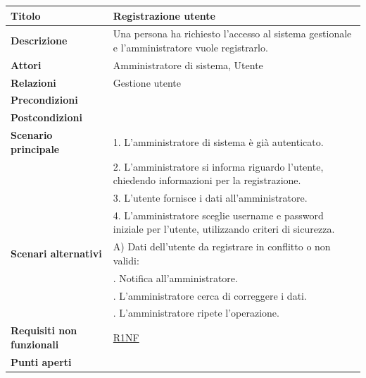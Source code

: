\documentclass[a4paper]{article}
\begin{document}


\begin{center}
\begin{tabularx}{1\textwidth}{|l|X|}
    \hline
	\textbf{Titolo} & Registrazione utente \\
	\hline
	\textbf{Descrizione} & Una persona ha richiesto l'accesso al sistema gestionale e l'amministratore vuole registrarlo. \\
	\hline
	\textbf{Attori} & Amministratore di sistema, Utente \\
	\hline
	\textbf{Relazioni} & Gestione utente \\
	\hline
	\textbf{Precondizioni} &  \\
	\hline
	\textbf{Postcondizioni} &  \\
	\hline
	\textbf{Scenario principale} & 1. L'amministratore di sistema è già autenticato.\\
	                             & 2. L'amministratore si informa riguardo l'utente, chiedendo informazioni per la registrazione.\\
								 & 3. L'utente fornisce i dati all'amministratore.\\
								 & 4. L'amministratore sceglie username e password iniziale per l'utente, utilizzando criteri di sicurezza.\\
	\hline
	\textbf{Scenari alternativi} & A) Dati dell'utente da registrare in conflitto o non validi: \\
								 & \quad 1. Notifica all'amministratore.\\
								 & \quad 2. L'amministratore cerca di correggere i dati.\\
								 & \quad 3. L'amministratore ripete l'operazione.\\
	\hline
	\textbf{Requisiti non funzionali} & \hyperlink{R1NF}{R1NF} \\
	\hline
	\textbf{Punti aperti} & \\
	\hline
\end{tabularx}
\end{center}




\end{document}
